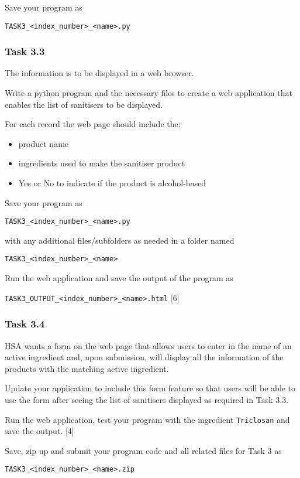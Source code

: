 Save your program as 

\texttt{TASK3\_<index\_number>\_<name>.py} 

\subsubsection*{Task 3.3}

The information is to be displayed in a web browser. 

Write a python program and the necessary files to create a web application
that enables the list of sanitisers to be displayed. 

For each record the web page should include the: 
\begin{itemize}
\item product name 
\item ingredients used to make the sanitiser product
\item \textquotedbl Yes\textquotedbl{} or \textquotedbl No\textquotedbl{}
to indicate if the product is alcohol-based 
\end{itemize}
Save your program as 

\texttt{TASK3\_<index\_number>\_<name>.py} 

with any additional files/subfolders as needed in a folder named 

\texttt{TASK3\_<index\_number>\_<name>} 

Run the web application and save the output of the program as 

\texttt{TASK3\_OUTPUT\_<index\_number>\_<name>.html}\hfill{} {[}6{]}

\subsubsection*{Task 3.4 }

HSA wants a form on the web page that allows users to enter in the
name of an active ingredient and, upon submission, will display all
the information of the products with the matching active ingredient. 

Update your application to include this form feature so that users
will be able to use the form after seeing the list of sanitisers displayed
as required in Task 3.3. 

Run the web application, test your program with the ingredient \textquotedbl\texttt{Triclosan}\textquotedbl{}
and save the output. \hfill{}{[}4{]}

Save, zip up and submit your program code and all related files for
Task 3 as 

\texttt{TASK3\_<index\_number>\_<name>.zip}